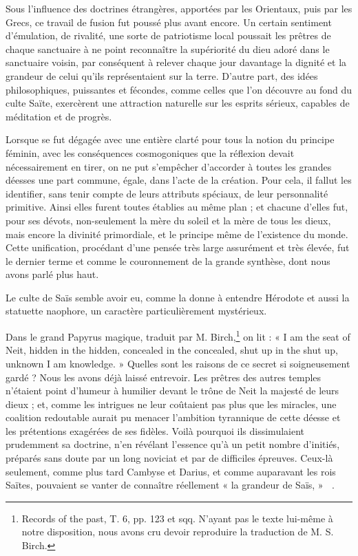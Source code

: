 \documentclass[letterpaper,twocolumn,openany,nodeprecatedcode]{dndbook}
\newcommand*\hieroAAAW{\raisebox{0.5ex}{}}
\newcommand*\hieroAACW{}
\newcommand*\hieroABAV{}
\begin{document}
Sous l'influence des doctrines étrangères, apportées par les Orientaux, puis par les Grecs, ce travail de fusion fut poussé plus avant encore. Un certain sentiment d'émulation, de rivalité, une sorte de patriotisme local poussait les prêtres de chaque sanctuaire à ne point reconnaître la supériorité du dieu adoré dans le sanctuaire voisin, par conséquent à relever chaque jour davantage la dignité et la grandeur de celui qu'ils représentaient sur la terre. D'autre part, des idées philosophiques, puissantes et fécondes, comme celles que l'on découvre au fond du culte Saïte, exercèrent une attraction naturelle sur les esprits sérieux, capables de méditation et de progrès.

Lorsque se fut dégagée avec une entière clarté pour tous la notion du principe féminin, avec les conséquences cosmogoniques que la réflexion devait nécessairement en tirer, on ne put s'empêcher d'accorder à toutes les grandes déesses une part commune, égale, dans l'acte de la création. Pour cela, il fallut les identifier, sans tenir compte de leurs attributs spéciaux, de leur personnalité primitive. Ainsi elles furent toutes établies au même plan ; et chacune d'elles fut, pour ses dévots, non-seulement la mère du soleil et la mère de tous les dieux, mais encore la divinité primordiale, et le principe même de l'existence du monde. Cette unification, procédant d'une pensée très large assurément et très élevée, fut le dernier terme et comme le couronnement de la grande synthèse, dont nous avons parlé plus haut.

Le culte de Saïs semble avoir eu, comme la donne à entendre Hérodote et aussi la statuette naophore, un caractère particulièrement mystérieux.

Dans le grand Papyrus magique, traduit par M. Birch,\footnote{Records of the past, T. 6, pp. 123 et sqq. N'ayant pas le texte lui-même à notre disposition, nous avons cru devoir reproduire la traduction de M. S. Birch.} on lit : « I am the seat of Neit, hidden in the hidden, concealed in the concealed, shut up in the shut up, unknown I am knowledge. » Quelles sont les raisons de ce secret si soigneusement gardé ? Nous les avons déjà laissé entrevoir. Les prêtres des autres temples n'étaient point d'humeur à humilier devant le trône de Neit la majesté de leurs dieux ; et, comme les intrigues ne leur coûtaient pas plus que les miracles, une coalition redoutable aurait pu menacer l'ambition tyrannique de cette déesse et les prétentions exagérées de ses fidèles. Voilà pourquoi ils dissimulaient prudemment sa doctrine, n'en révélant l'essence qu'à un petit nombre d'initiés, préparés sans doute par un long noviciat et par de difficiles épreuves. Ceux-là seulement, comme plus tard Cambyse et Darius, et comme auparavant les rois Saïtes, pouvaient se vanter de connaître réellement « la grandeur de Saïs, » $\hieroABAV\:\hieroAACW\:\hieroAAAW$.
\end{document}
